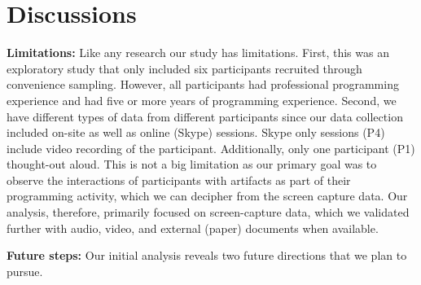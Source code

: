 
\section{Discussions}
\textbf{Limitations:} Like any research our study has limitations. First, this was an exploratory study that only included six participants recruited through convenience sampling. However, all participants had professional programming experience and had five or more years of programming experience. Second, we have different types of data from different participants since our data collection included on-site as well as online (Skype) sessions. Skype only sessions (P4) include video recording of the participant. Additionally, only one participant (P1) thought-out aloud. This is not a big limitation as our primary goal was to observe the interactions of participants with artifacts as part of their programming activity, which we can decipher from the screen capture data. Our analysis, therefore, primarily focused on screen-capture data, which we validated further with audio, video, and external (paper) documents when available.


\textbf{Future steps: }Our initial analysis reveals two future directions that we plan to pursue. 


